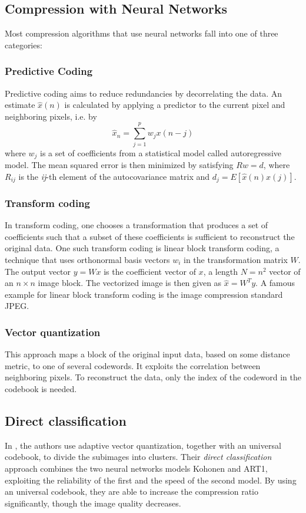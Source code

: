 \subsection{Compression with Neural Networks}
Most compression algorithms that use neural networks fall into one of three categories\cite{Dony1995}: 

\subsubsection{Predictive Coding}
Predictive coding aims to reduce redundancies by decorrelating the data. An estimate \(\hat{x}(n)\) is calculated by applying a predictor to the current pixel and neighboring pixels, i.e. by
\begin{equation}
\hat{x}_n = \sum_{j=1}^{p} w_j x(n-j)
\end{equation}
where \({w_j}\) is a set of coefficients from a statistical model called autoregressive model. The mean squared error is then minimized by satisfying \(Rw = d\), where \(R_{ij}\) is the \emph{ij}-th element of the autocovariance matrix and \(d_j = E[\hat{x}(n)x(j)]\).

\subsubsection{Transform coding}
In transform coding, one chooses a transformation that produces a set of coefficients such that a subset of these coefficients is sufficient to reconstruct the original data. One such transform coding is linear block transform coding, a technique that uses orthonormal basis vectors \(w_i\) in the transformation matrix \(W\). The output vector \(y = Wx\) is the coefficient vector of \(x\), a length \(N = n^2\) vector of an \(n \times n\) image block. The vectorized image is then given as \(\hat{x} = W^Ty\). 
A famous example for linear block transform coding is the image compression standard JPEG.

\subsubsection{Vector quantization}
This approach maps a block of the original input data, based on some distance metric, to one of several codewords. It exploits the correlation between neighboring pixels. To reconstruct the data, only the index of the codeword in the codebook is needed. 

\subsection{Direct classification}
In \cite{Soliman2006258}, the authors use adaptive vector quantization, together with an universal codebook, to divide the subimages into clusters. Their \emph{direct classification} approach combines the two neural networks models Kohonen and ART1, exploiting the reliability of the first and the speed of the second model. By using an universal codebook, they are able to increase the compression ratio significantly, though the image quality decreases.


